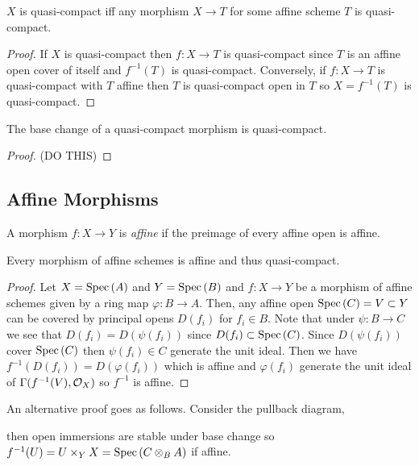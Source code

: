 \documentclass[12pt]{article}
\begin{document}
\begin{proposition}
$X$ is quasi-compact iff any morphism $X \to T$ for some affine scheme $T$ is quasi-compact.
\end{proposition}

\begin{proof}
If $X$ is quasi-compact then $f : X \to T$ is quasi-compact since $T$ is an affine open cover of itself and $f^{-1}(T)$ is quasi-compact. Conversely, if $f : X \to T$ is quasi-compact with $T$ affine then $T$ is quasi-compact open in $T$ so $X = f^{-1}(T)$ is quasi-compact.
\end{proof}

\begin{lemma}
The base change of a quasi-compact morphism is quasi-compact.
\end{lemma}

\begin{proof}
(DO THIS)
\end{proof}

\subsection{Affine Morphisms}

\begin{defn}
A morphism $f : X \to Y$ is \textit{affine} if the preimage of every affine open is affine.
\end{defn}

\begin{lemma}
Every morphism of affine schemes is affine and thus quasi-compact.
\end{lemma}

\begin{proof}
Let $X = \mathrm{Spec}\left( A \right)$ and $Y = \mathrm{Spec}\left( B \right)$ and $f : X \to Y$ be a morphism of affine schemes given by a ring map $\varphi : B \to A$. Then, any affine open $\mathrm{Spec}\left( C \right) = V \subset Y$ can be covered by principal opens $D(f_i)$ for $f_i \in B$. Note that under $\psi : B \to C$ we see that $D(f_i) = D(\psi(f_i))$ since $D(f_i) \subset \mathrm{Spec}\left( C \right)$. Since $D(\psi(f_i))$ cover $\mathrm{Spec}\left( C \right)$ then $\psi(f_i) \in C$ generate the unit ideal. Then we have $f^{-1}(D(f_i)) = D(\varphi(f_i))$ which is affine and $\varphi(f_i)$ generate the unit ideal of $\Gamma(f^{-1}(V), \mathcal{O}_{X})$ so $f^{-1}$ is affine.
\end{proof}

\begin{rmk}
An alternative proof goes as follows. Consider the pullback diagram,
\begin{center}
\end{center}
then open immersions are stable under base change so $f^{-1}(U) = U \times_Y X = \mathrm{Spec}\left( C \otimes_B A \right)$ if affine.
\end{rmk}
\end{document}
